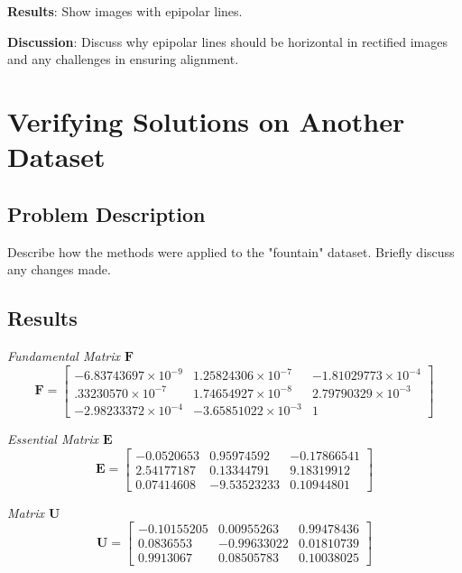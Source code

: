 \documentclass{article}
\begin{document}
\textbf{Results}: Show images with epipolar lines.


\textbf{Discussion}: Discuss why epipolar lines should be horizontal in rectified images and any challenges in ensuring alignment.

\section{Verifying Solutions on Another Dataset}
\subsection{Problem Description}
Describe how the methods were applied to the "fountain" dataset. Briefly discuss any changes made.

\subsection{Results}

\textit{Fundamental Matrix $\mathbf{F}$}
\[
\mathbf{F} = \begin{bmatrix} 
-6.83743697 \times 10^{-9} & 1.25824306 \times 10^{-7} & -1.81029773 \times 10^{-4} \\ 
.33230570 \times 10^{-7} & 1.74654927 \times 10^{-8} & 2.79790329 \times 10^{-3} \\ 
-2.98233372 \times 10^{-4} & -3.65851022 \times 10^{-3} & 1 
\end{bmatrix}
\]

\textit{Essential Matrix $\mathbf{E}$}
\[
\mathbf{E} = \begin{bmatrix}
-0.0520653 & 0.95974592 & -0.17866541 \\ 
2.54177187 & 0.13344791 & 9.18319912 \\ 
0.07414608 & -9.53523233 & 0.10944801 
\end{bmatrix}
\]

\textit{Matrix $\mathbf{U}$}
\[
\mathbf{U} = \begin{bmatrix}
-0.10155205 & 0.00955263 & 0.99478436 \\ 
0.0836553 & -0.99633022 & 0.01810739 \\ 
0.9913067 & 0.08505783 & 0.10038025 
\end{bmatrix}
\]
\end{document}

